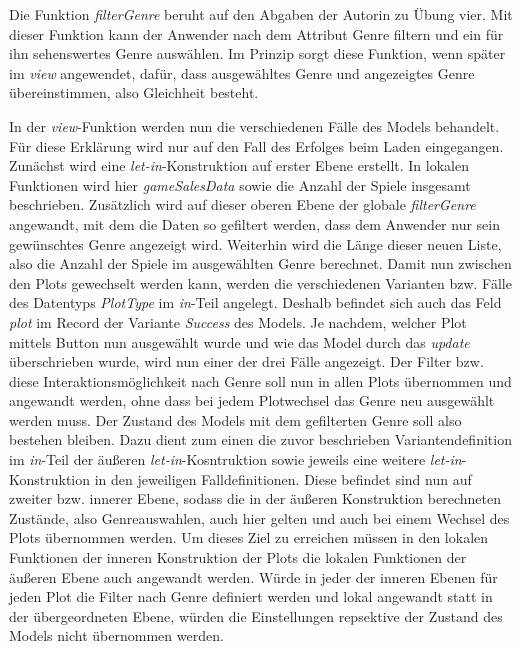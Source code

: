 \documentclass[usegeometry=true]{scrartcl}
\begin{document}
Die Funktion \textit{filterGenre} beruht auf den Abgaben der Autorin zu Übung vier. Mit dieser Funktion kann der Anwender nach dem Attribut Genre filtern und ein für ihn sehenswertes Genre auswählen.
Im Prinzip sorgt diese Funktion, wenn später im \textit{view} angewendet, dafür, dass ausgewähltes Genre und angezeigtes Genre übereinstimmen, also Gleichheit besteht.

In der \textit{view}-Funktion werden nun die verschiedenen Fälle des Models behandelt. 
Für diese Erklärung wird nur auf den Fall des Erfolges beim Laden eingegangen.
Zunächst wird eine \textit{let-in}-Konstruktion auf erster Ebene erstellt. 
In lokalen Funktionen wird hier \textit{gameSalesData} sowie die Anzahl der Spiele insgesamt beschrieben.
Zusätzlich wird auf dieser oberen Ebene der globale \textit{filterGenre} angewandt, mit dem die Daten so gefiltert werden, dass dem Anwender nur sein gewünschtes Genre angezeigt wird.
Weiterhin wird die Länge dieser neuen Liste, also die Anzahl der Spiele im ausgewählten Genre berechnet. 
Damit nun zwischen den Plots gewechselt werden kann, werden die verschiedenen Varianten bzw. Fälle des Datentyps \textit{PlotType} im \textit{in}-Teil angelegt. 
Deshalb befindet sich auch das Feld \textit{plot} im Record der Variante \textit{Success} des Models.
Je nachdem, welcher Plot mittels Button nun ausgewählt wurde und wie das Model durch das \textit{update} überschrieben wurde, wird nun einer der drei Fälle angezeigt. 
Der Filter bzw. diese Interaktionsmöglichkeit nach Genre soll nun in allen Plots übernommen und angewandt werden, ohne dass bei jedem Plotwechsel das Genre neu ausgewählt werden muss. 
Der Zustand des Models mit dem gefilterten Genre soll also bestehen bleiben.
Dazu dient zum einen die zuvor beschrieben Variantendefinition im \textit{in}-Teil der äußeren \textit{let-in}-Kosntruktion sowie jeweils eine weitere \textit{let-in}-Konstruktion in den jeweiligen Falldefinitionen.
Diese befindet sind nun auf zweiter bzw. innerer Ebene, sodass die in der äußeren Konstruktion berechneten Zustände, also Genreauswahlen, auch hier gelten und auch bei einem Wechsel des Plots übernommen werden. 
Um dieses Ziel zu erreichen müssen in den lokalen Funktionen der inneren Konstruktion der Plots die lokalen Funktionen der äußeren Ebene auch angewandt werden. 
Würde in jeder der inneren Ebenen für jeden Plot die Filter nach Genre definiert werden und lokal angewandt statt in der übergeordneten Ebene, würden die Einstellungen repsektive der Zustand des Models nicht übernommen werden.
\end{document}
